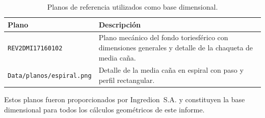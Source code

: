 \begin{table}[H]
	\centering
	\caption{Planos de referencia utilizados como base dimensional.}
	\label{tab:planos_referencia}
	\begin{tabularx}{\textwidth}{@{}lX@{}}
		\toprule
		\textbf{Plano} & \textbf{Descripci\'on} \\
		\midrule
		\texttt{REV2DMI17160102} & Plano mec\'anico del fondo toriesf\'erico con dimensiones generales y detalle de la chaqueta de media ca\~na. \\
		\texttt{Data/planos/espiral.png} & Detalle de la media ca\~na en espiral con paso y perfil rectangular. \\
		\bottomrule
	\end{tabularx}
\end{table}

Estos planos fueron proporcionados por Ingredion~S.A. y constituyen la base dimensional para todos los c\'alculos geom\'etricos de este informe.

